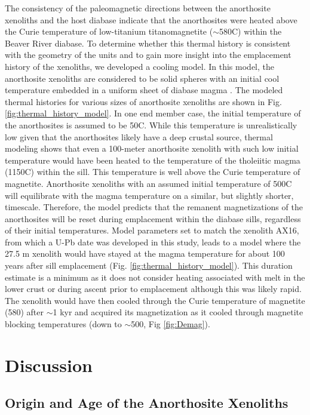 The consistency of the paleomagnetic directions between the anorthosite xenoliths and the host diabase indicate that the anorthosites were heated above the Curie temperature of low-titanium titanomagnetite ($\sim$580\textdegree C) within the Beaver River diabase. To determine whether this thermal history is consistent with the geometry of the units and to gain more insight into the emplacement history of the xenoliths, we developed a cooling model. In this model, the anorthosite xenoliths are considered to be solid spheres with an initial cool temperature embedded in a uniform sheet of diabase magma \citep{Delaney1987a, Unsworth1979a}. The modeled thermal histories for various sizes of anorthosite xenoliths are shown in Fig. \ref{fig:thermal_history_model}. In one end member case, the initial temperature of the anorthosites is assumed to be 50\textdegree C. While this temperature is unrealistically low given that the anorthosites likely have a deep crustal source, thermal modeling shows that even a 100-meter anorthosite xenolith with such low initial temperature would have been heated to the temperature of the tholeiitic magma (1150\textdegree C) within the sill. This temperature is well above the Curie temperature of magnetite. Anorthosite xenoliths with an assumed initial temperature of 500\textdegree C will equilibrate with the magma temperature on a similar, but slightly shorter, timescale. Therefore, the model predicts that the remanent magnetizations of the anorthosites will be reset during emplacement within the diabase sills, regardless of their initial temperatures. Model parameters set to match the xenolith AX16, from which a U-Pb date was developed in this study, leads to a model where the 27.5 m xenolith would have stayed at the magma temperature for about 100 years after sill emplacement (Fig. \ref{fig:thermal_history_model}). This duration estimate is a minimum as it does not consider heating associated with melt in the lower crust or during ascent prior to emplacement although this was likely rapid. The xenolith would have then cooled through the Curie temperature of magnetite (580\textdegree) after $\sim$1 kyr and acquired its magnetization as it cooled through magnetite blocking temperatures (down to $\sim$500\textdegree, Fig \ref{fig:Demag}).

\section{Discussion}
\subsection{Origin and Age of the Anorthosite Xenoliths}


